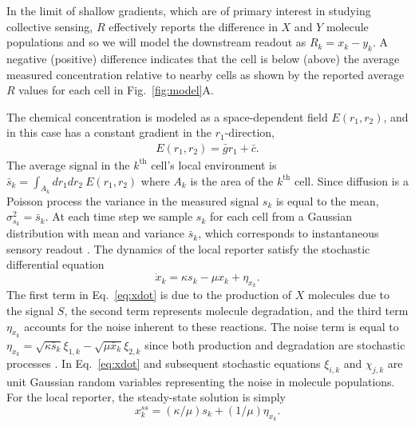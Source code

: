 In the limit of shallow gradients, which are of primary interest in studying collective sensing, $R$ effectively reports the difference in $X$ and $Y$ molecule populations \cite{ellison2016cell} and so we will model the downstream readout as $R_k = x_k-y_k$. A negative (positive) difference indicates that the cell is below (above) the average measured concentration relative to nearby cells as shown by the reported average $R$ values for each cell in Fig.\ \ref{fig:model}A.

The chemical concentration is modeled as a space-dependent field $E(r_1,r_2)$, and in this case has a constant gradient in the $r_1$-direction,
\begin{gather*}
    E(r_1,r_2) = \bar{g}r_1 + \bar{c}.
\end{gather*}
The average signal in the $k^\text{th}$ cell's local environment is $\bar{s}_k = \int_{A_k} dr_1 dr_2 \ E(r_1,r_2)$ where $A_k$ is the area of the $k^\text{th}$ cell. Since diffusion is a Poisson process the variance in the measured signal $s_k$ is equal to the mean, $\sigma_{s_k}^2 = \bar{s}_k$. At each time step we sample $s_k$ for each cell from a Gaussian distribution with mean and variance $\bar{s}_k$, which corresponds to instantaneous sensory readout \cite{ellison2016cell}. The dynamics of the local reporter satisfy the stochastic differential equation
\begin{equation} \label{eq:xdot}
    \dot{x}_k = \kappa s_k - \mu x_k + \eta_{x_k}.
\end{equation}
The first term in Eq.\ \ref{eq:xdot} is due to the production of $X$ molecules due to the signal $S$, the second term represents molecule degradation, and the third term $\eta_{x_k}$ accounts for the noise inherent to these reactions. The noise term is equal to
$\eta_{x_k} = \sqrt{\kappa\bar{s}_k}\xi_{1,k} - \sqrt{\mu \bar{x}_k} \xi_{2,k}$ since both production and degradation are stochastic processes \cite{gillespie2000chemical}.
In Eq.\ \ref{eq:xdot} and subsequent stochastic equations $\xi_{i,k}$ and $\chi_{j,k}$ are unit Gaussian random variables representing the noise in molecule populations. For the local reporter, the steady-state solution is simply
\begin{equation} \label{eq:xss}
    x_{k}^{ss} = \left( \kappa/\mu \right) s_k + \left( 1/\mu \right) \eta_{x_k}.
\end{equation}

